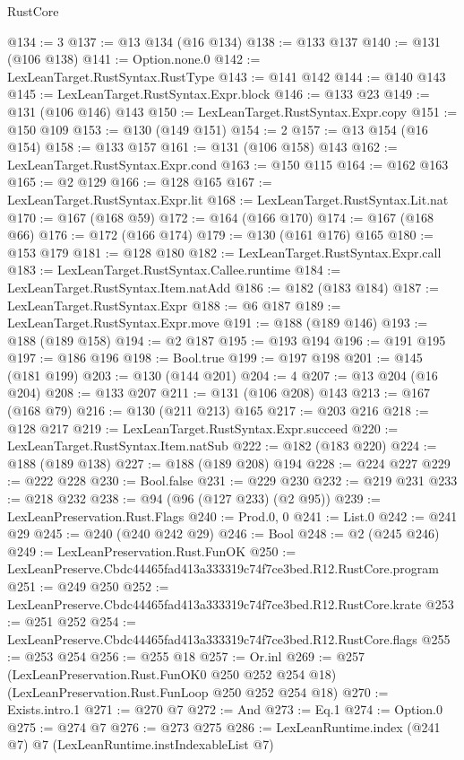 \begin{lexlean}{RustCore}
\begin{coremodule}
@134 := 3
@137 := @13 @134 (@16 @134)
@138 := @133 @137
@140 := @131 (@106 @138)
@141 := Option.none.{0}
@142 := LexLeanTarget.RustSyntax.RustType
@143 := @141 @142
@144 := @140 @143
@145 := LexLeanTarget.RustSyntax.Expr.block
@146 := @133 @23
@149 := @131 (@106 @146) @143
@150 := LexLeanTarget.RustSyntax.Expr.copy
@151 := @150 @109
@153 := @130 (@149 @151)
@154 := 2
@157 := @13 @154 (@16 @154)
@158 := @133 @157
@161 := @131 (@106 @158) @143
@162 := LexLeanTarget.RustSyntax.Expr.cond
@163 := @150 @115
@164 := @162 @163
@165 := @2 @129
@166 := @128 @165
@167 := LexLeanTarget.RustSyntax.Expr.lit
@168 := LexLeanTarget.RustSyntax.Lit.nat
@170 := @167 (@168 @59)
@172 := @164 (@166 @170)
@174 := @167 (@168 @66)
@176 := @172 (@166 @174)
@179 := @130 (@161 @176) @165
@180 := @153 @179
@181 := @128 @180
@182 := LexLeanTarget.RustSyntax.Expr.call
@183 := LexLeanTarget.RustSyntax.Callee.runtime
@184 := LexLeanTarget.RustSyntax.Item.natAdd
@186 := @182 (@183 @184)
@187 := LexLeanTarget.RustSyntax.Expr
@188 := @6 @187
@189 := LexLeanTarget.RustSyntax.Expr.move
@191 := @188 (@189 @146)
@193 := @188 (@189 @158)
@194 := @2 @187
@195 := @193 @194
@196 := @191 @195
@197 := @186 @196
@198 := Bool.true
@199 := @197 @198
@201 := @145 (@181 @199)
@203 := @130 (@144 @201)
@204 := 4
@207 := @13 @204 (@16 @204)
@208 := @133 @207
@211 := @131 (@106 @208) @143
@213 := @167 (@168 @79)
@216 := @130 (@211 @213) @165
@217 := @203 @216
@218 := @128 @217
@219 := LexLeanTarget.RustSyntax.Expr.succeed
@220 := LexLeanTarget.RustSyntax.Item.natSub
@222 := @182 (@183 @220)
@224 := @188 (@189 @138)
@227 := @188 (@189 @208) @194
@228 := @224 @227
@229 := @222 @228
@230 := Bool.false
@231 := @229 @230
@232 := @219 @231
@233 := @218 @232
@238 := @94 (@96 (@127 @233) (@2 @95))
@239 := LexLeanPreservation.Rust.Flags
@240 := Prod.{0, 0}
@241 := List.{0}
@242 := @241 @29
@245 := @240 (@240 @242 @29)
@246 := Bool
@248 := @2 (@245 @246)
@249 := LexLeanPreservation.Rust.FunOK
@250 := LexLeanPreserve.Cbdc44465fad413a333319c74f7ce3bed.R12.RustCore.program
@251 := @249 @250
@252 := LexLeanPreserve.Cbdc44465fad413a333319c74f7ce3bed.R12.RustCore.krate
@253 := @251 @252
@254 := LexLeanPreserve.Cbdc44465fad413a333319c74f7ce3bed.R12.RustCore.flags
@255 := @253 @254
@256 := @255 @18
@257 := Or.inl
@269 := @257
    (LexLeanPreservation.Rust.FunOK0 @250 @252 @254 @18)
    (LexLeanPreservation.Rust.FunLoop @250 @252 @254 @18)
@270 := Exists.intro.{1}
@271 := @270 @7
@272 := And
@273 := Eq.{1}
@274 := Option.{0}
@275 := @274 @7
@276 := @273 @275
@286 := LexLeanRuntime.index
    (@241 @7)
    @7
    (LexLeanRuntime.instIndexableList @7)

\end{coremodule}
\end{lexlean}
